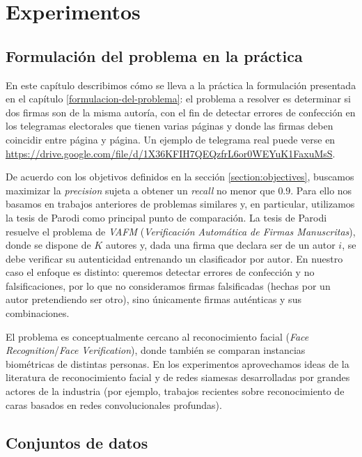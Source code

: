 \chapter{Experimentos} \label{chapter:experimentos}

\section{Formulación del problema en la práctica}

En este capítulo describimos cómo se lleva a la práctica la formulación presentada en el capítulo \ref{formulacion-del-problema}: el problema a resolver es determinar si dos firmas son de la misma autoría, con el fin de detectar errores de confección en los telegramas electorales que tienen varias páginas y donde las firmas deben coincidir entre página y página. Un ejemplo de telegrama real puede verse en \url{https://drive.google.com/file/d/1X36KFIH7QEQzfrL6or0WEYuK1FaxuMsS}. 

De acuerdo con los objetivos definidos en la sección \ref{section:objectives}, buscamos maximizar la \textit{precision} sujeta a obtener un \textit{recall} no menor que $0.9$. Para ello nos basamos en trabajos anteriores de problemas similares y, en particular, utilizamos la tesis de Parodi \cite{tesis-parodi} como principal punto de comparación. La tesis de Parodi resuelve el problema de \textit{VAFM} (\textit{Verificación Automática de Firmas Manuscritas}), donde se dispone de $K$ autores y, dada una firma que declara ser de un autor $i$, se debe verificar su autenticidad entrenando un clasificador por autor. En nuestro caso el enfoque es distinto: queremos detectar errores de confección y no falsificaciones, por lo que no consideramos firmas falsificadas (hechas por un autor pretendiendo ser otro), sino únicamente firmas auténticas y sus combinaciones. 

El problema es conceptualmente cercano al reconocimiento facial (\textit{Face Recognition}/\textit{Face Verification}), donde también se comparan instancias biométricas de distintas personas. En los experimentos aprovechamos ideas de la literatura de reconocimiento facial y de redes siamesas desarrolladas por grandes actores de la industria (por ejemplo, trabajos recientes sobre reconocimiento de caras basados en redes convolucionales profundas).

\section{Conjuntos de datos}

